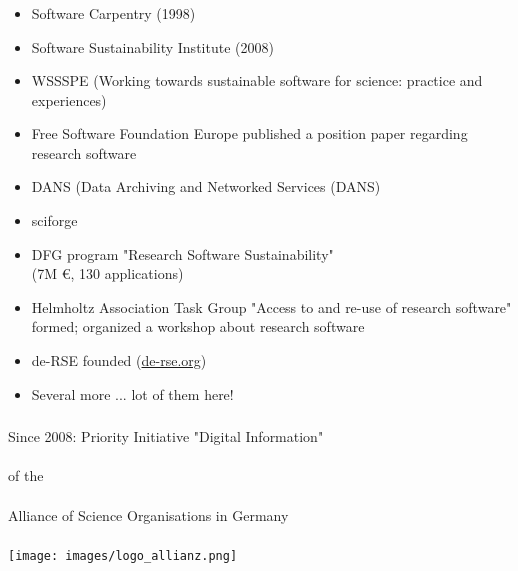 \documentclass{beamer}
\begin{document}
\begin{frame}
  \frametitle{}
  \begin{block}{}
    {\footnotesize
      \begin{itemize}
      \item Software Carpentry (1998)\pause
      \item Software Sustainability Institute (2008)\pause
      \item WSSSPE (Working towards sustainable software for science:
        practice and experiences)\pause
      \item Free Software Foundation Europe published a position paper
        regarding research software\pause
      \item DANS (Data Archiving and Networked Services (DANS)\pause
      \item sciforge\pause
      \item DFG program "Research Software Sustainability"\\
        (7M €, 130 applications)\pause
      \item Helmholtz Association Task Group "Access to and re-use of
        research software" formed; organized a workshop about
        research software\pause
      \item de-RSE founded (\href{http://de-rse.org}{de-rse.org})\pause
      \item Several more ... lot of them here!
    \end{itemize}
    }
  \end{block}
\end{frame}

\begin{frame}
  \frametitle{}
  \begin{center}
    Since 2008: Priority Initiative "Digital Information"\\  \ \\
    of the\\ \ \\
    Alliance of Science Organisations in Germany\\
    \ \\
    \texttt{[image: images/logo\_allianz.png]}\\
    \ \\
  \end{center}
\end{frame}
\end{document}
